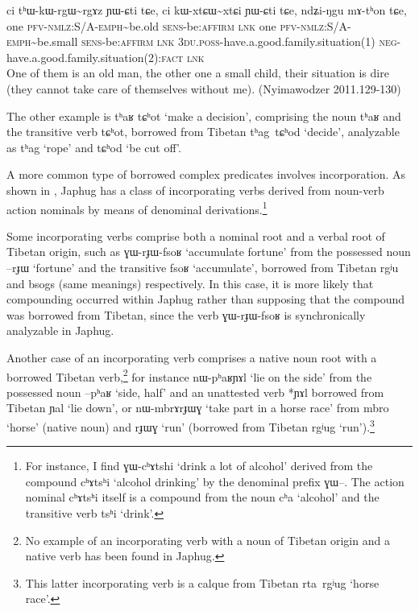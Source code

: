 \documentclass[oldfontcommands,oneside,a4paper,11pt]{article}
\newcommand{\ipa}[1]{{\phon \mbox{#1}}} %
\begin{document}
\begin{exe}
\ex \label{ex:ndZiNgu.mAthon}
\gll
\ipa{ci}  	\ipa{tʰɯ-kɯ-rgɯ\textasciitilde{}rgɤz}  	\ipa{ɲɯ-ɕti}  	\ipa{tɕe,}  	\ipa{ci}  	\ipa{kɯ-xtɕɯ\textasciitilde{}xtɕi}  	\ipa{ɲɯ-ɕti}  	\ipa{tɕe,}  	\ipa{ndʑi-ŋgu}  	\ipa{mɤ-tʰon}  	\ipa{tɕe,}  	  \\
one \textsc{pfv-nmlz}:S/A-\textsc{emph}\textasciitilde{}be.old \textsc{sens}-be:\textsc{affirm} \textsc{lnk} one \textsc{pfv-nmlz}:S/A-\textsc{emph}\textasciitilde{}be.small \textsc{sens}-be:\textsc{affirm} \textsc{lnk} \textsc{3du.poss}-have.a.good.family.situation(1) \textsc{neg}-have.a.good.family.situation(2):\textsc{fact} \textsc{lnk} \\
\glt One of them is an old man, the other one a small child, their situation is dire (they cannot take care of themselves without me). (Nyimawodzer 2011.129-130)
\end{exe}  

The other example is \ipa{tʰaʁ} \ipa{tɕʰot} `make a decision', comprising the noun \ipa{tʰaʁ} and the transitive verb \ipa{tɕʰot}, borrowed from Tibetan  \ipa{tʰag tɕʰod} `decide', analyzable as \ipa{tʰag} `rope' and \ipa{tɕʰod} `be cut off'.

A more common type of borrowed complex predicates involves incorporation. As shown in \citet{jacques12incorp}, Japhug has a class of incorporating verbs derived from noun-verb action nominals by means of denominal derivations.\footnote{For instance, I find \ipa{ɣɯ-cʰɤtshi} `drink a lot of alcohol' derived from the compound \ipa{cʰɤtsʰi} `alcohol drinking' by the denominal prefix \ipa{ɣɯ--}. The action nominal \ipa{cʰɤtsʰi} itself is a compound from the noun \ipa{cʰa} `alcohol' and the transitive verb \ipa{tsʰi} `drink'.}

Some incorporating verbs comprise both a nominal root and a verbal root of Tibetan origin, such as \ipa{ɣɯ-rɟɯ-fsoʁ} `accumulate fortune' from the possessed noun \ipa{--rɟɯ} `fortune' and the transitive \ipa{fsoʁ} `accumulate', borrowed from Tibetan \ipa{rgʲu} and \ipa{bsogs} (same meanings) respectively. In this case, it is more likely that compounding occurred within Japhug rather than supposing that the compound was borrowed from Tibetan, since the verb \ipa{ɣɯ-rɟɯ-fsoʁ} is synchronically analyzable in Japhug.

Another case of an incorporating verb comprises a native noun root with a borrowed Tibetan verb,\footnote{No example of an incorporating verb with a noun of Tibetan origin and a native verb has been found in Japhug.} for instance  \ipa{nɯ-pʰaʁɲɤl} `lie on the side' from the possessed noun \ipa{--pʰaʁ} `side, half' and an unattested verb *\ipa{ɲɤl} borrowed from Tibetan \ipa{ɲal} `lie down', or \ipa{nɯ-mbrɤrɟɯɣ} `take part in a horse race' from \ipa{mbro} `horse' (native noun) and \ipa{rɟɯɣ} `run' (borrowed from Tibetan \ipa{rgʲug} `run').\footnote{This latter incorporating verb is a calque from Tibetan \ipa{rta rgʲug} `horse race'.}
  
\end{document}

